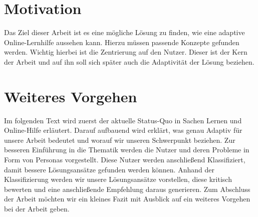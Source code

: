 \section{Motivation}
Das Ziel dieser Arbeit ist es eine mögliche Lösung zu finden, wie eine adaptive Online-Lernhilfe aussehen kann. Hierzu müssen passende Konzepte gefunden werden. Wichtig hierbei ist die Zentrierung auf den Nutzer. Dieser ist der Kern der Arbeit und auf ihn soll sich später auch die Adaptivität der Lösung beziehen. 

\section{Weiteres Vorgehen}
Im folgenden Text wird zuerst der aktuelle Status-Quo in Sachen Lernen und Online-Hilfe erläutert. Darauf aufbauend wird erklärt, was genau Adaptiv für unsere Arbeit bedeutet und worauf wir unseren Schwerpunkt beziehen. Zur besseren Einführung in die Thematik werden die Nutzer und deren Probleme in Form von Personas vorgestellt. Diese Nutzer werden anschließend Klassifiziert, damit bessere Lösungsansätze gefunden werden können. Anhand der Klassifizierung werden wir unsere Lösungsansätze vorstellen, diese kritisch bewerten und eine anschließende Empfehlung daraus generieren. Zum Abschluss der Arbeit möchten wir ein kleines Fazit mit Ausblick auf ein weiteres Vorgehen bei der Arbeit geben.


